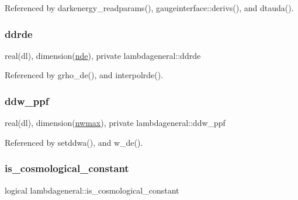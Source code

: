 Referenced by darkenergy\+\_\+readparams(), gaugeinterface\+::derivs(), and dtauda().

\mbox{\label{namespacelambdageneral_a4076e8b34d8ff5774ed58d456c862c14}} 
\subsubsection{\texorpdfstring{ddrde}{ddrde}}
{\footnotesize\ttfamily real(dl), dimension(\mbox{\hyperlink{namespacelambdageneral_ae21da0c8fff86159b789dee9579bd7d5}{nde}}), private lambdageneral\+::ddrde\hspace{0.3cm}{\ttfamily [private]}}



Referenced by grho\+\_\+de(), and interpolrde().

\mbox{\label{namespacelambdageneral_abf25efe08b2d793e499129d1bbd0ad61}} 
\subsubsection{\texorpdfstring{ddw\+\_\+ppf}{ddw\_ppf}}
{\footnotesize\ttfamily real(dl), dimension(\mbox{\hyperlink{namespacelambdageneral_a72ab4fcacd74a66fe577794d5294864b}{nwmax}}), private lambdageneral\+::ddw\+\_\+ppf\hspace{0.3cm}{\ttfamily [private]}}



Referenced by setddwa(), and w\+\_\+de().

\mbox{\label{namespacelambdageneral_a8ac10c80c54ab03dde5512cfa1baf5d2}} 
\subsubsection{\texorpdfstring{is\+\_\+cosmological\+\_\+constant}{is\_cosmological\_constant}}
{\footnotesize\ttfamily logical lambdageneral\+::is\+\_\+cosmological\+\_\+constant}



